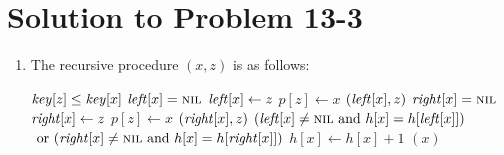 \documentclass[a4paper, fleqn]{article}
\begin{document}
\section*{Solution to Problem 13-3}
\begin{enumerate}
\renewcommand{\labelenumi}{\itshape \bfseries \alph{enumi}.}

\item  %
The recursive procedure $(x,z)$ is as follows:
\begin{codebox}
\li \If $\id{key}[z] \leq \id{key}[x]$
\li   \Then
        \If $\id{left}[x] = \const{nil}$
\li       \Then
            $\id{left}[x] \gets z$
\li         $p[z] \gets x$
\li       \Else
            $(\id{left}[x], z)$
        \End
\li   \Else
        \If $\id{right}[x] = \const{nil}$
\li       \Then
            $\id{right}[x] \gets z$
\li         $p[z] \gets x$
\li       \Else
            $(\id{right}[x], z)$
        \End
    \End
\li \If $(\id{left}[x] \neq \const{nil} \mbox{ and } h[x] = h[\id{left}[x]])$
\li    \>$\mbox{ or } (\id{right}[x] \neq \const{nil} \mbox{ and } h[x] = h[\id{right}[x]])$
\li   \Then $h[x] \gets h[x] + 1$
    \End
\li {}$(x)$
\end{codebox}
\end{enumerate}
\end{document}
